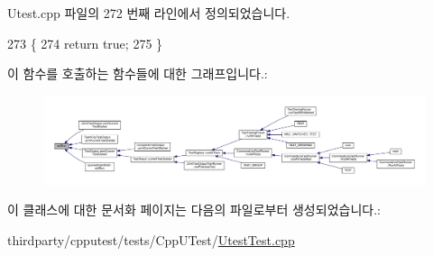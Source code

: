 Utest.\+cpp 파일의 272 번째 라인에서 정의되었습니다.


\begin{DoxyCode}
273 \{
274     \textcolor{keywordflow}{return} \textcolor{keyword}{true};
275 \}
\end{DoxyCode}


이 함수를 호출하는 함수들에 대한 그래프입니다.\+:
\nopagebreak
\begin{figure}[H]
\begin{center}
\leavevmode
\includegraphics[width=350pt]{class_utest_shell_afa35d9bf0fd1c772b04f48d89d318a70_icgraph}
\end{center}
\end{figure}




이 클래스에 대한 문서화 페이지는 다음의 파일로부터 생성되었습니다.\+:\begin{DoxyCompactItemize}
\item 
thirdparty/cpputest/tests/\+Cpp\+U\+Test/\hyperlink{_utest_test_8cpp}{Utest\+Test.\+cpp}\end{DoxyCompactItemize}

